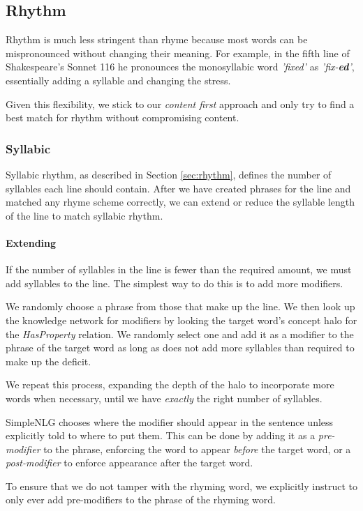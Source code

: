 \subsection{Rhythm}
Rhythm is much less stringent than rhyme because most words can be mispronounced without changing their meaning. For example, in the fifth line of Shakespeare's Sonnet 116 he pronounces the monosyllabic word \textit{'fixed'} as \textit{'fix-\textbf{ed}'}, essentially adding a syllable and changing the stress.

Given this flexibility, we stick to our \textit{content first} approach and only try to find a best match for rhythm without compromising content. 

\subsubsection{Syllabic}
Syllabic rhythm, as described in Section \ref{sec:rhythm}, defines the number of syllables each line should contain. After we have created phrases for the line and matched any rhyme scheme correctly, we can extend or reduce the syllable length of the line to match syllabic rhythm.

\paragraph{Extending}
If the number of syllables in the line is fewer than the required amount, we must add syllables to the line. The simplest way to do this is to add more modifiers.

We randomly choose a phrase from those that make up the line. We then look up the knowledge network for modifiers by looking the target word's concept halo for the \textit{HasProperty} relation. We randomly select one and add it as a modifier to the phrase of the target word as long as does not add more syllables than required to make up the deficit.

We repeat this process, expanding the depth of the halo to incorporate more words when necessary, until we have \textit{exactly} the right number of syllables.

SimpleNLG chooses where the modifier should appear in the sentence unless explicitly told to where to put them. This can be done by adding it as a \textit{pre-modifier} to the phrase, enforcing the word to appear \textit{before} the target word, or a \textit{post-modifier} to enforce appearance after the target word.

To ensure that we do not tamper with the rhyming word, we explicitly instruct to only ever add pre-modifiers to the phrase of the rhyming word.

